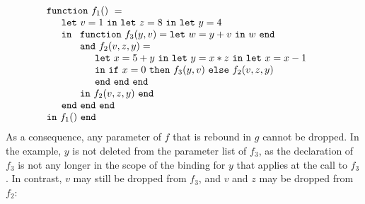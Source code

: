 \begin{equation}
\label{FunctionalConstructionProgram7}
\begin{array}{l}
\mathtt{function}\ f_1()\ = \\
  \quad
  \begin{array}{l}
     \mathtt{let}\ v = 1 \ 
     \mathtt{in\ let}\ z = 8 \ 
     \mathtt{in\ let}\ y = 4\\
     \mathtt{in}\ 
     \begin{array}[t]{l}
       \mathtt{function}\ f_3(y,v) = 
          \mathtt{let}\ w = y+v\ \mathtt{in}\ w\ \mathtt{end}\\
       \mathtt{and}\ f_2(v,z,y) =\\
         \quad
         \begin{array}{l}
           \mathtt{let}\ x = 5+y\
           \mathtt{in\ let}\ y = x*z\
           \mathtt{in\ let}\ x = x-1\\
           \mathtt{in}\
             \mathtt{if}\ x=0\
             \mathtt{then}\ f_3(y,v)\ 
             \mathtt{else}\ f_2(v,z,y)\\
           \mathtt{end\ end\ end}
         \end{array}\\
     \mathtt{in}\ f_2(v,z,y)\ \mathtt{end}
     \end{array}\\
     \mathtt{end\ end\ end}\\
   \end{array}\\
\mathtt{in}\ f_1()\  \mathtt{end}
\end{array}
\end{equation}
As a consequence, any parameter of $f$ that is rebound in $g$ cannot
be dropped. In the example, $y$ is not deleted from the parameter list
of $f_3$, as the declaration of $f_3$ is not any longer in the scope
of the binding for $y$ that applies at the call to $f_3$. In contrast,
$v$ may still be dropped from $f_3$, and $v$ and $z$ may be dropped
from $f_2$:
